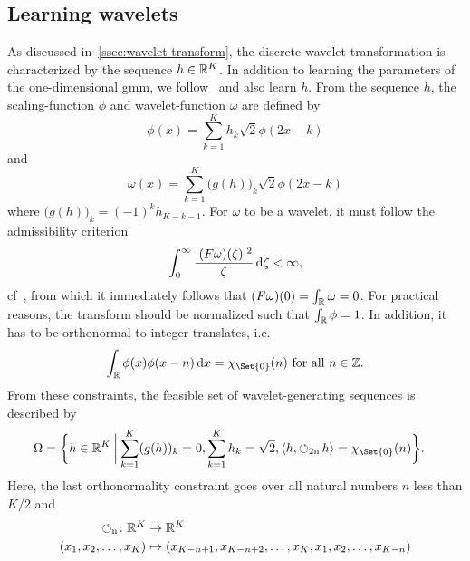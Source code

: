 \subsection{Learning wavelets}%
\label{sssec:learning wavelets}
As discussed in~\cref{ssec:wavelet transform}, the discrete wavelet transformation is characterized by the sequence \( h \in \mathbb{R}^K \).
In addition to learning the parameters of the one-dimensional \gls{gmm}, we follow~\cite{grandits_optimizing_2018} and also learn \( h \).
From the sequence \( h \), the scaling-function \( \phi \) and wavelet-function \( \omega \) are defined by
\begin{equation}
	\phi(x) = \sum_{k=\num{1}}^K h_k \sqrt{\num{2}} \phi(\num{2}x - k)
\end{equation}
and
\begin{equation}
	\omega(x) = \sum_{k=\num{1}}^K\bigl(g(h)\bigr)_k\sqrt{\num{2}}\phi(\num{2}x - k)
\end{equation}
where \( \bigl(g(h)\bigr)_k = (\num{-1})^kh_{K - k - \num{1}} \).
For \( \omega \) to be a wavelet, it must follow the admissibility criterion
\begin{equation}
	\int_{\num{0}}^\infty \frac{|(F \omega)(\zeta)|^{\num{2}}}{\zeta}\,\mathrm{d}\zeta < \infty,
\end{equation}
cf~\cite{mallat_multiresolution_1989}, from which it immediately follows that \( (F \omega)(\num{0}) = \int_{\mathbb{R}} \omega = \num{0} \).
For practical reasons, the transform should be normalized such that \( \int_{\mathbb{R}} \phi = \num{1} \).
In addition, it has to be orthonormal to integer translates, i.e.
\begin{equation}
	\int_{\R} \phi(x)\phi(x-n)\,\mathrm{d}x = \CharacteristicFunction{\Set{\num{0}}}(n)\ \text{for all}\ n \in \mathbb{Z}.
\end{equation}
From these constraints, the feasible set of wavelet-generating sequences is described by
\begin{equation}
	\begin{aligned}
	\Omega = \biggl\{ &h \in \R^K \SetSymbol[\bigg] \sum_{k=\num{1}}^K (g(h))_k = \num{0}, \sum_{k=\num{1}}^K h_k = \sqrt{\num{2}}, \langle h, \operatorname{\circlearrowleft_{2n}} h \rangle = \CharacteristicFunction{\Set{\num{0}}}(n)\biggr\}.
	\end{aligned}
\end{equation}
Here, the last orthonormality constraint goes over all natural numbers \( n \) less than \( K / \num{2} \) and
\begin{equation}
	\begin{aligned}
		\operatorname{\circlearrowleft_{n}} \colon \mathbb{R}^K& \to \mathbb{R}^K \\
		(x_{\num{1}}, x_{\num{2}}, \dotsc, x_K) &\mapsto (x_{K-n+\num{1}}, x_{K-n+\num{2}},\dotsc,x_{K},x_{\num{1}},x_{\num{2}},\dotsc,x_{K-n})
	\end{aligned}
\end{equation}

